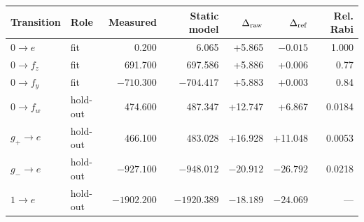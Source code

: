 \begin{tabular}{llrrrrr}
Transition & Role & Measured & Static model & $\Delta_{\rm raw}$ & $\Delta_{\rm ref}$ & Rel. Rabi \\
\hline
$0\to e$ & fit & 0.200 & 6.065 & +5.865 & $-0.015$ & 1.000 \\
$0\to f_z$ & fit & 691.700 & 697.586 & +5.886 & +0.006 & 0.77 \\
$0\to f_y$ & fit & $-710.300$ & $-704.417$ & +5.883 & +0.003 & 0.84 \\
$0\to f_w$ & hold-out & 474.600 & 487.347 & +12.747 & +6.867 & 0.0184 \\
$g_+\to e$ & hold-out & 466.100 & 483.028 & +16.928 & +11.048 & 0.0053 \\
$g_-\to e$ & hold-out & $-927.100$ & $-948.012$ & $-20.912$ & $-26.792$ & 0.0218 \\
$1\to e$ & hold-out & $-1902.200$ & $-1920.389$ & $-18.189$ & $-24.069$ & --- \\
\end{tabular}
